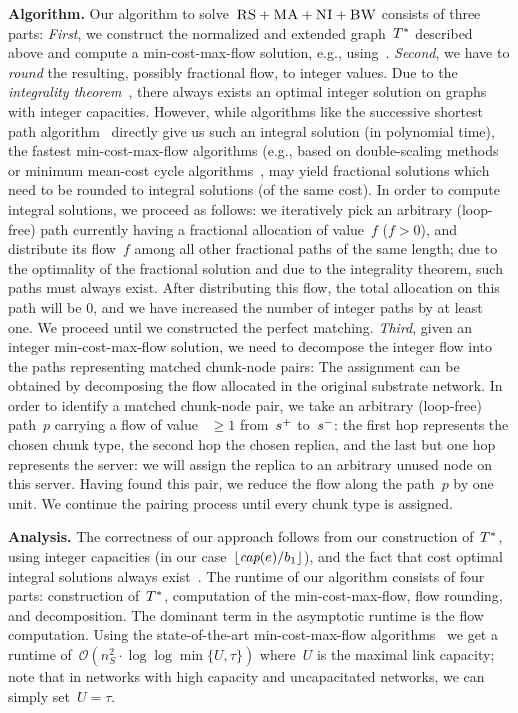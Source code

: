 \textbf{Algorithm.}
Our algorithm to solve~$\textsc{RS}+\textsc{MA}+\textsc{NI}+\textsc{BW}$ consists of three parts:
\emph{First}, we construct the normalized and extended graph~$T^*$
described above and compute
a min-cost-max-flow solution, e.g.,
using~\cite{mincostmaxflow-1,mincostmaxflow-2}.
\emph{Second}, we have to \emph{round} the resulting, possibly fractional flow, to
integer values. Due to the \emph{integrality theorem}~\cite{flow-book},
there always exists an optimal integer solution on graphs with integer capacities.
However, while algorithms like the successive shortest path algorithm~\cite{successive_shortest_path_complexity}
directly give us such an integral solution (in polynomial time), the fastest min-cost-max-flow algorithms (e.g., based on double-scaling
methods~\cite{mincostmaxflow-1} or minimum mean-cost cycle
algorithms~\cite{mincostmaxflow-2}, may yield fractional solutions
which need to be rounded to integral solutions (of the same cost).
In order to compute integral solutions, we proceed as follows: we iteratively
pick an arbitrary (loop-free) path
currently having a fractional allocation of value~$f$ ($f>0$), and distribute its flow~$f$
among all other fractional paths of the same length; due to the optimality of the fractional solution
and due to the integrality theorem, such paths must always exist. After distributing this flow,
the total allocation on this path will be 0, and we have increased the number of
integer paths by at least one. We proceed until we constructed the perfect
matching.
\emph{Third}, given an integer min-cost-max-flow solution, we need to decompose
the integer flow into the paths
representing matched chunk-node pairs:
The assignment can be obtained by decomposing the flow allocated in the
original substrate network. In order to identify a matched chunk-node pair,
we take an arbitrary (loop-free) path~$p$ carrying a flow of value ~$\geq 1$ from~$s^{+}$ to~$s^{-}$:
the first hop represents the chosen chunk type, the second hop the chosen
replica, and the last but one hop represents the server: we will assign
the replica to an arbitrary unused node on this server.
Having found this pair, we reduce the flow
along the path~$p$ by one unit.
We continue the pairing process until every chunk type is assigned.

\textbf{Analysis.}
The correctness of our approach follows from our construction
of~$T^*$, using integer capacities (in our case~$\lfloor\emph{cap}(e)/b_1\rfloor$),
and the fact that cost optimal integral solutions always exist~\cite{flow-book}.
The runtime of our algorithm consists of four parts: construction of~$T^*$,
computation of the min-cost-max-flow, flow rounding, and decomposition. The
dominant term in the asymptotic runtime is the flow computation.
Using the state-of-the-art min-cost-max-flow
algorithms~\cite{mincostmaxflow-1,mincostmaxflow-2}
we get a runtime of~$\mathcal{O}(n_S^2 \cdot \log\log \min \{U,\tau\})$
where~$U$ is the maximal link capacity; note that in networks with high capacity
and uncapacitated networks, we can simply set~$U=\tau$.


